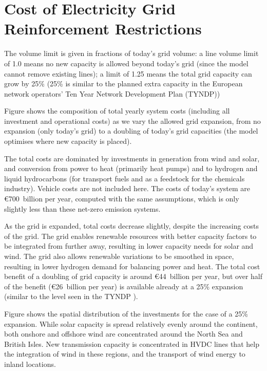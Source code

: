 \section*{Cost of Electricity Grid Reinforcement Restrictions}
\label{sec:lv}



The volume limit is given in fractions of today's grid volume: a
line volume limit of 1.0 means no new capacity is allowed beyond today's grid
(since the model cannot remove existing lines); a limit of 1.25 means the total
grid capacity can grow by 25\% (25\% is similar to the planned extra capacity in
the European network operators' Ten Year Network Development Plan (TYNDP)\cite{TYNDP2016})

Figure shows the composition of total yearly system costs
(including all investment and operational costs) as we vary the allowed
grid expansion, from no expansion (only today's grid) to
a doubling of today's grid capacities (the model optimises where new
capacity is placed).

The total costs are dominated by investments in generation from wind
and solar, and conversion from power to heat (primarily heat pumps)
and to hydrogen and liquid hydrocarbons (for transport fuels and as a
feedstock for the chemicals industry). Vehicle costs are not included
here. The costs of today's system are \euro700~billion per year,
computed with the same assumptions, which is only slightly less than
these net-zero emission systems.

As the grid is expanded, total costs decrease
slightly, despite the increasing costs of the grid. The grid enables
renewable resources with better capacity factors to be integrated from
further away, resulting in lower capacity needs for solar and
wind. The grid also allows renewable variations to be smoothed in space,
resulting in lower hydrogen demand for balancing power and heat.  The
total cost benefit of a doubling of grid capacity is around
\euro44~billion per year, but over half of the benefit (\euro26~billion per year) is available already at a 25\% expansion (similar to the level seen in the TYNDP \cite{TYNDP2016}).

Figure shows the spatial distribution of the investments
for the case of a 25\% expansion. While solar capacity is spread
relatively evenly around the continent, both onshore and offshore wind
are concentrated around the North Sea and British Isles. New
transmission capacity is concentrated in HVDC lines that help the
integration of wind in these regions, and the transport of wind energy
to inland locations.

